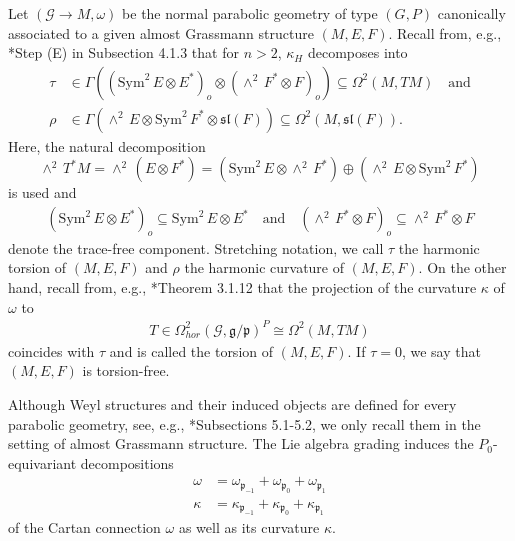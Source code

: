 \documentclass[11pt]{amsart}
\newtheorem{lemma}[proposition]{Lemma}
\begin{document}
Let $(\mathcal G\to M,\omega)$ be the normal parabolic geometry of type $(G,P)$ canonically associated to a given almost Grassmann structure $(M,E,F)$. Recall from, e.g., \cite{Book}*{Step (E) in Subsection 4.1.3} that for $n>2$, $\kappa_H$ decomposes into 
\begin{equation}\label{harmonic components AG}
\begin{aligned}
    \tau&\in\Gamma\left((\mathrm{Sym}^2\,E\otimes E^*)_o\otimes(\wedge^2\,F^*\otimes F)_o\right)\subseteq\Omega^2(M,TM)\quad\text{and}\\
    \rho&\in\Gamma(\wedge^2\,E\otimes \mathrm{Sym}^2\,F^*\otimes\mathfrak {sl}(F))\subseteq\Omega^2(M,\mathfrak {sl}(F)).
\end{aligned}
\end{equation}
Here, the natural decomposition
\[\wedge^2\,T^*M=\wedge^2\,(E\otimes F^*)=(\mathrm{Sym}^2\,E\otimes\wedge^2\,F^*)\oplus(\wedge^2\,E\otimes \mathrm{Sym}^2\,F^*)\]
is used and
\begin{align*}
(\mathrm{Sym}^2\,E\otimes E^*)_o\subseteq \mathrm{Sym}^2\,E\otimes E^*
\quad\text{and}\quad
(\wedge^2\,F^*\otimes F)_o\subseteq \wedge^2\,F^*\otimes F
\end{align*}
denote the trace-free component. Stretching notation, we call $\tau$ the harmonic torsion of $(M,E,F)$ and $\rho$ the harmonic curvature of $(M,E,F)$. On the other hand, recall from, e.g., \cite{Book}*{Theorem 3.1.12} that the projection of the curvature $\kappa$ of $\omega$ to 
\begin{align}\label{T def}
T\in\Omega^2_{hor}(\mathcal G,\mathfrak g/\mathfrak p)^P\cong\Omega^2(M,TM)    
\end{align}
coincides with $\tau$ and is called the torsion of $(M,E,F)$. If $\tau=0$, we say that $(M,E,F)$ is torsion-free.

Although Weyl structures and their induced objects are defined for every parabolic geometry, see, e.g., \cite{Book}*{Subsections 5.1-5.2}, we only recall them in the setting of almost Grassmann structure. The Lie algebra grading induces the $P_0$-equivariant decompositions
\begin{align*}
    \omega&=\omega_{\mathfrak p_{-1}}+\omega_{\mathfrak p_0}+\omega_{\mathfrak p_1}\\
    \kappa&=\kappa_{\mathfrak p_{-1}}+\kappa_{\mathfrak p_0}+\kappa_{\mathfrak p_1}
\end{align*}
of the Cartan connection $\omega$ as well as its curvature $\kappa$.
\end{document}
